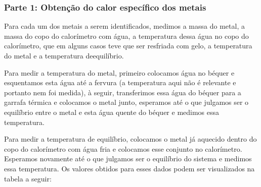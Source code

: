 \documentclass[a4paper]{article}
\begin{document}
			\subsubsection{Parte 1: Obtenção do calor específico dos metais}

			Para cada um dos metais a serem identificados, medimos a massa do
			metal, a massa do copo do calorímetro com água, a temperatura dessa
			água no copo do calorímetro, que em alguns casos teve que ser resfriada
			com gelo, a temperatura do metal e a temperatura deequilíbrio.

			Para medir a temperatura do metal, primeiro colocamos água no béquer
			e esquentamos esta água até a fervura (a temperatura aqui não é relevante
			e portanto nem foi medida), à seguir, transferimos essa água do béquer
			para a garrafa térmica e colocamos o metal junto, esperamos até o
			que julgamos ser o equilíbrio entre o metal e esta água quente do
			béquer e medimos essa temperatura.

			Para medir a temperatura de equilíbrio, colocamos o metal já aquecido
			dentro do copo do calorímetro com água fria e colocamos esse conjunto
			no calorímetro. Esperamos novamente até o que julgamos ser o equilíbrio
			do sistema e medimos essa temperatura. Os valores obtidos para esses
			dados podem ser visualizados na tabela a seguir:
\end{document}
